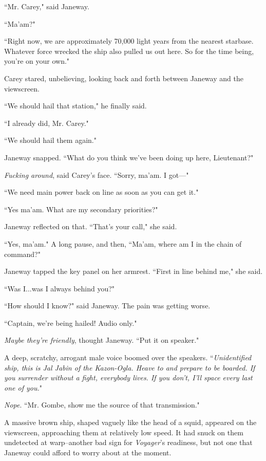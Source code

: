 \documentclass[twoside,letterpaper,12pt]{memoir}
\begin{document}
``Mr. Carey," said Janeway.

``Ma'am?"

``Right now, we are approximately 70,000 light years from the nearest starbase. Whatever force wrecked the ship also pulled us out here. So for the time being, you're on your own."

Carey stared, unbelieving, looking back and forth between Janeway and the viewscreen.

``We should hail that station," he finally said.

``I already did, Mr. Carey."

``We should hail them again."

Janeway snapped. ``What do you think we've been doing up here, Lieutenant?"

\textit{Fucking around}, said Carey's face. ``Sorry, ma'am. I got---"

``We need main power back on line as soon as you can get it."

``Yes ma'am. What are my secondary priorities?"

Janeway reflected on that. ``That's your call," she said.

``Yes, ma'am." A long pause, and then, ``Ma'am, where am I in the chain of command?"

Janeway tapped the key panel on her armrest. ``First in line behind me," she said.

``Was I...was I always behind you?"

``How should I know?" said Janeway. The pain was getting worse.

``Captain, we're being hailed! Audio only."

\textit{Maybe they're friendly}, thought Janeway. ``Put it on speaker."

A deep, scratchy, arrogant male voice boomed over the speakers. ``\textit{Unidentified ship, this is Jal Jabin of the Kazon-Ogla. Heave to and prepare to be boarded. If you surrender without a fight, everybody lives. If you don't, I'll space every last one of you.}"

\textit{Nope}. ``Mr. Gombe, show me the source of that transmission."

A massive brown ship, shaped vaguely like the head of a squid, appeared on the viewscreen, approaching them at relatively low speed. It had snuck on them undetected at warp--another bad sign for \textit{Voyager}'s readiness, but not one that Janeway could afford to worry about at the moment.
\end{document}
